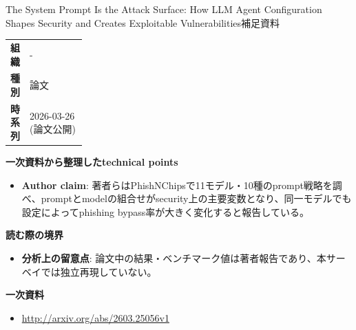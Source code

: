 \begin{technicalnote}{The System Prompt Is the Attack Surface: How LLM Agent Configuration Shapes Security and Creates Exploitable Vulnerabilities}{補足資料}
\begingroup
\begin{tabularx}{\linewidth}{@{}>{\bfseries}p{0.22\linewidth}X@{}}
組織 & - \\
種別 & 論文 \\
時系列 & 2026-03-26 (論文公開) \\
\end{tabularx}
\smallskip
{\bfseries 一次資料から整理したtechnical points}
\begin{itemize}[leftmargin=1.5em,itemsep=0.35em]
\item \textbf{Author claim}: 著者らはPhishNChipsで11モデル・10種のprompt戦略を調べ、promptとmodelの組合せがsecurity上の主要変数となり、同一モデルでも設定によってphishing bypass率が大きく変化すると報告している。
\end{itemize}
\begin{minipage}{\linewidth}
{\bfseries 読む際の境界}
\begin{itemize}[leftmargin=1.5em,itemsep=0.35em]
\item \textbf{分析上の留意点}: 論文中の結果・ベンチマーク値は著者報告であり、本サーベイでは独立再現していない。
\end{itemize}
\begin{samepage}
{\bfseries 一次資料}
\begingroup\sloppy
\begin{itemize}[leftmargin=1.5em,itemsep=0.25em]
\item {\scriptsize\url{http://arxiv.org/abs/2603.25056v1}}
\end{itemize}
\endgroup
\end{samepage}
\end{minipage}
\endgroup
\end{technicalnote}
\medskip

